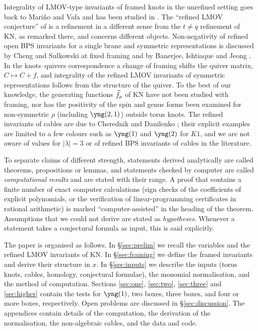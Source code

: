 Integrality of LMOV-type invariants of framed knots in the unrefined setting goes back to Mari\~no and Vafa \cite{Marino01} and has been studied in \cite{Zhu21,Luo16,Luo21,Wang25,Zhu25}.
The ``refined LMOV conjecture'' of \cite{Zhu21} is a refinement in a different sense from the $t\neq q$ refinement of KN, as remarked there, and concerns different objects.
Non-negativity of refined open BPS invariants for a single brane and symmetric representations is discussed by Cheng and Su\l{}kowski \cite{Cheng21} at fixed framing and by Banerjee, Ishtiaque and Jeong \cite{Banerjee26}.
In the knots--quivers correspondence \cite{Kucharski17,Kucharski17b,Ekholm18} a change of framing shifts the quiver matrix, $C\mapsto C+f$,
and integrality of the refined LMOV invariants of symmetric representations follows from the structure of the quiver.
To the best of our knowledge, the generating functions $\widehat{f}_\rho$ of KN have not been studied with framing, nor has the positivity of the spin and genus forms been examined for non-symmetric $\rho$ (including $\yng(2,1)$) outside torus knots.
The refined invariants of cables are due to Cherednik and Danilenko \cite{Cherednik14,Cherednik15};
their explicit examples are limited to a few colours such as $\yng(1)$ and $\yng(2)$ for $K1$, and we are not aware of values for $|\lambda|=3$ or of refined BPS invariants of cables in the literature.

To separate claims of different strength, statements derived analytically are called theorems, propositions or lemmas,
and statements checked by computer are called \emph{computational results} and are stated with their range.
A proof that contains a finite number of exact computer calculations (sign checks of the coefficients of explicit polynomials, or the verification of linear-programming certificates in rational arithmetic)
is marked ``computer-assisted'' in the heading of the theorem.
Assumptions that we could not derive are stated as \emph{hypotheses}.
Whenever a statement takes a conjectural formula as input, this is said explicitly.

The paper is organised as follows.
In \S\ref{sec:prelim} we recall the variables and the refined LMOV invariants of KN.
In \S\ref{sec:framing} we define the framed invariants and derive their structure in $x$.
In \S\ref{sec:inputs} we describe the inputs (torus knots, cables, homology, conjectural formulae), the monomial normalisation, and the method of computation.
Sections \ref{sec:one}, \ref{sec:two}, \ref{sec:three} and \ref{sec:higher} contain the tests for $\yng(1)$, two boxes, three boxes, and four or more boxes, respectively.
Open problems are discussed in \S\ref{sec:discussion}.
The appendices contain details of the computation, the derivation of the normalisation, the non-algebraic cables, and the data and code.
